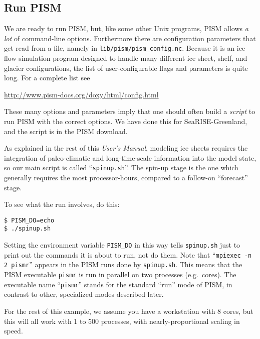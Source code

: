 \subsection{Run PISM}   \label{subsect:runscript}  We are ready to run PISM, but, like some other Unix programs, PISM allows \emph{a lot} of command-line options.  Furthermore there are configuration parameters that get read from a file, namely in \texttt{lib/pism/pism_config.nc}.  Because it is an ice flow simulation program designed to handle many different ice sheet, shelf, and glacier configurations, the list of user-configurable flags and parameters is quite long.  For a complete list see
\begin{center}
\url{http://www.pism-docs.org/doxy/html/config.html}
\end{center}

These many options and parameters imply that one should often build a \emph{script} to run PISM with the correct options.  We have done this for SeaRISE-Greenland, and the script is in the PISM download.

As explained in the rest of this \emph{User's Manual}, modeling ice sheets requires the integration of paleo-climatic and long-time-scale information into the model state, so our main script is called ``\texttt{spinup.sh}''.  The spin-up stage is the one which generally requires the most processor-hours, compared to a follow-on ``forecast'' stage.

To see what the run involves, do this:
\begin{verbatim}
$ PISM_DO=echo
$ ./spinup.sh
\end{verbatim}
\noindent Setting the environment variable \texttt{PISM_DO} in this way tells \texttt{spinup.sh} just to print out the commands it is about to run, not do them.  Note that ``\texttt{mpiexec -n 2 pismr}'' appears in the PISM runs done by \texttt{spinup.sh}.  This means that the PISM executable \texttt{pismr} is run in parallel on two processes (e.g.~cores).  The executable name ``\texttt{pismr}'' stands for the standard ``run'' mode of PISM, in contrast to other, specialized modes described later.

For the rest of this example, we assume you have a workstation with 8 cores, but this will all work with 1 to 500 processes, with nearly-proportional scaling in speed.

